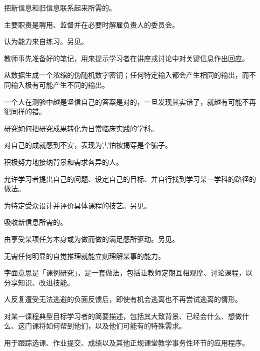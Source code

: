 \begin{description}
 把新信息和旧信息联系起来所需的。

 主要职责是聘用、监督并在必要时解雇负责人的委员会。

 认为能力来自练习。另见。

 教师事先准备好的笔记，用来提示学习者在讲座或讨论中对关键信息作出回应。

 从数据生成一个浓缩的伪随机数字密钥；任何特定输入都会产生相同的输出，而不同输入极有可能产生不同的输出。

 一个人在测验中越是坚信自己的答案是对的，一旦发现其实错了，就越有可能不再犯同样的错。

 研究如何把研究成果转化为日常临床实践的学科。

 对自己的成就感到不安，表现为害怕被揭穿是个骗子。

 积极努力地接纳背景和需求各异的人。

 允许学习者提出自己的问题、设定自己的目标、并自行找到学习某一学科的路径的做法。

 为特定受众设计并评价具体课程的技艺。另见。

 吸收新信息所需的。

 由享受某项任务本身或为做而做的满足感所驱动。另见。

 无需任何明显的自觉推理就能立刻理解某事的能力。

 字面意思是「课例研究」，是一套做法，包括让教师定期互相观摩、讨论课程，以分享知识、改进技能。

 人反复遭受无法逃避的负面反馈后，即使有机会逃离也不再尝试逃离的情形。

 对某一课程典型目标学习者的简要描述，包括其大致背景、已经会什么、想做什么、这门课将如何帮到他们，以及他们可能有的特殊需求。

 用于跟踪选课、作业提交、成绩以及其他正规课堂教学事务性环节的应用程序。


\end{description}

